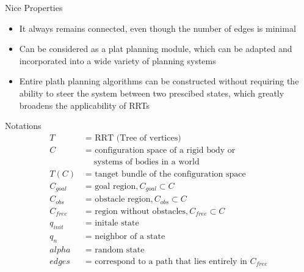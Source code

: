 \documentclass[%
  professionalfonts,%
  xcolor={%
    usenames,%
    dvipsnames,%
    svgnames,%
    table,%
    hyperref%
  }%
]{beamer}
\begin{document}
      \begin{frame}{Nice Properties}
        \begin{itemize}
          \item It always remains connected, even though the number of edges is minimal
          \item Can be considered as a plat planning module, which can be adapted and incorporated into a wide variety of planning systems
          \item Entire plath planning algorithms can be constructed without requiring the ability to steer the system between two prescibed states, which greatly broadens the applicability of RRTs
        \end{itemize}
      \end{frame}
      
      \begin{frame}{Notations}
        \begin{align*}
        T        & \text{ = RRT (Tree of vertices)}\\
        C        & \text{ = configuration space of a rigid body or}\\
                 & \text{ ~~ systems of bodies in a world}\\
        T(C)     & \text{ = tanget bundle of the configuration space}\\
        C_{goal} & \text{ = goal region},  C_{goal} \subset C\\
        C_{obs}  & \text{ = obstacle region},  C_{obs} \subset C\\
        C_{free} & \text{ = region without obstacles}, C_{free} \subset C\\
        q_{init} & \text{ = initale state}\\
        q_n      & \text{ = neighbor of a state}\\
        alpha    & \text{ = random state}\\
        edges    & \text{ = correspond to a path that lies entirely in } C_{free}\\
        \end{align*}
      \end{frame}
      
\end{document}
